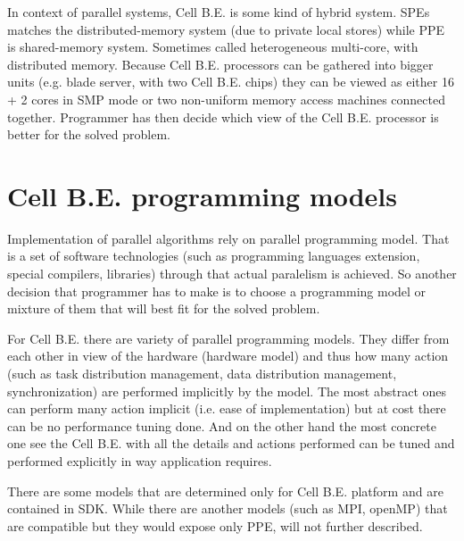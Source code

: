 In context of parallel systems, Cell B.E. is some kind of hybrid system.
SPEs matches the distributed-memory system (due to private local stores) while PPE is shared-memory system.
Sometimes called heterogeneous multi-core, with distributed memory.
Because Cell B.E. processors can be gathered into bigger units (e.g. blade server, with two Cell B.E. chips) they can be viewed as either 16 + 2 cores in SMP mode or two non-uniform memory access machines connected together.
Programmer has then decide which view of the Cell B.E. processor is better for the solved problem.

\section{Cell B.E. programming models}

Implementation of parallel algorithms rely on parallel programming model.
That is a set of software technologies (such as programming languages extension, special compilers, libraries) through that actual paralelism is achieved.
So another decision that programmer has to make is to choose a programming model or mixture of them that will best fit for the solved problem.

For Cell B.E. there are variety of parallel programming models.
They differ from each other in view of the hardware (hardware model) and thus how many action (such as task distribution management, data distribution management, synchronization) are performed implicitly by the model.
 The most abstract ones can perform many action implicit (i.e. ease of implementation) but at cost there can be no performance tuning done.
 And on the other hand the most concrete one see the Cell B.E. with all the details and actions performed can be tuned and performed explicitly in way application requires.

There are some models that are determined only for Cell B.E. platform and are contained in SDK.
 While there are another models (such as MPI, openMP) that are compatible but they would expose only PPE, will not further described.

